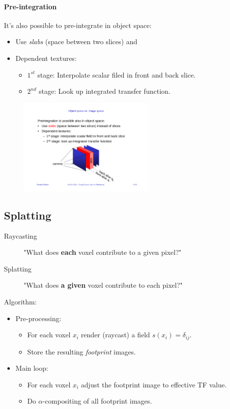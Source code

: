 \paragraph{Pre-integration}
It's also possible to pre-integrate in object space:
\begin{itemize}
\item Use \emph{slabs} (space between two slices) and
\item Dependent textures:
    \begin{itemize}
        \item $1^{st}$ stage: Interpolate scalar filed in front and back slice.
        \item $2^{nd}$ stage: Look up integrated transfer function.
    \end{itemize}
\end{itemize}
\begin{figure}[H]
    \centering
    \includegraphics[width=0.6\textwidth]{img/04_object_space_preintegration}
\end{figure}

\subsection{Splatting}

\begin{description}
    \item[Raycasting] "What does \textbf{each} voxel contribute to a given pixel?"
    \item[Splatting] "What does \textbf{a given} voxel contribute to each pixel?"
\end{description}

Algorithm:
\begin{itemize}
    \item Pre-processing:
        \begin{itemize}
            \item For each voxel $x_i$ render (raycast) a field $s(x_i) = \delta_{ij}$.
            \item Store the resulting \emph{footprint} images.
        \end{itemize}
    \item Main loop:
        \begin{itemize}
            \item For each voxel $x_i$ adjust the footprint image to effective TF value.
            \item Do $\alpha$-compositing of all footprint images.
        \end{itemize}
\end{itemize}


